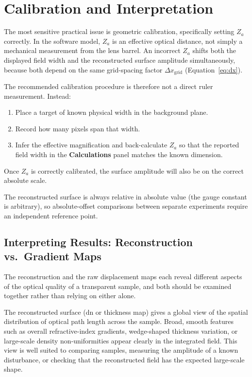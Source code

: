 \documentclass[11pt]{article}
\begin{document}
\section{Calibration and Interpretation}
\label{sec:calibration}

The most sensitive practical issue is geometric calibration, specifically
setting $Z_a$ correctly. In the software model, $Z_a$ is an effective optical
distance, not simply a mechanical measurement from the lens barrel. An
incorrect $Z_a$ shifts both the displayed field width and the reconstructed
surface amplitude simultaneously, because both depend on the same
grid-spacing factor $\Delta x_{\mathrm{grid}}$ (Equation~\eqref{eq:dx}).

The recommended calibration procedure is therefore not a direct ruler
measurement. Instead:
\begin{enumerate}[noitemsep]
  \item Place a target of known physical width in the background plane.
  \item Record how many pixels span that width.
  \item Infer the effective magnification and back-calculate $Z_a$ so that
        the reported field width in the \textbf{Calculations} panel matches
        the known dimension.
\end{enumerate}

Once $Z_a$ is correctly calibrated, the surface amplitude will also be
on the correct absolute scale.

The reconstructed surface is always relative in absolute value (the gauge
constant is arbitrary), so absolute-offset comparisons between separate
experiments require an independent reference point.

\subsection{Interpreting Results: Reconstruction vs.\ Gradient Maps}

The reconstruction and the raw displacement maps each reveal different
aspects of the optical quality of a transparent sample, and both should
be examined together rather than relying on either alone.

The reconstructed surface (dn or thickness map) gives a global view of
the spatial distribution of optical path length across the sample.
Broad, smooth features such as overall refractive-index gradients,
wedge-shaped thickness variation, or large-scale density non-uniformities
appear clearly in the integrated field. This view is well suited to
comparing samples, measuring the amplitude of a known disturbance, or
checking that the reconstructed field has the expected large-scale shape.
\end{document}
